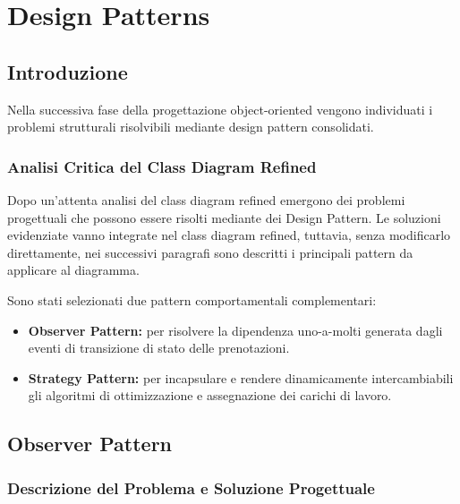 \section{Design Patterns}

\subsection{Introduzione}

Nella successiva fase della progettazione object-oriented vengono individuati i problemi strutturali risolvibili mediante design pattern consolidati.

\subsubsection{Analisi Critica del Class Diagram Refined}

Dopo un'attenta analisi del class diagram refined emergono dei problemi progettuali che possono essere risolti mediante dei Design Pattern. Le soluzioni evidenziate vanno integrate nel class diagram refined, tuttavia, senza modificarlo direttamente, nei successivi paragrafi sono descritti i principali pattern da applicare al diagramma.

Sono stati selezionati due pattern comportamentali complementari:
\begin{itemize}[leftmargin=*]
    \item \textbf{Observer Pattern:} per risolvere la dipendenza uno-a-molti generata dagli eventi di transizione di stato delle prenotazioni.
    \item \textbf{Strategy Pattern:} per incapsulare e rendere dinamicamente intercambiabili gli algoritmi di ottimizzazione e assegnazione dei carichi di lavoro.
\end{itemize}

\subsection{Observer Pattern}

\subsubsection{Descrizione del Problema e Soluzione Progettuale}

